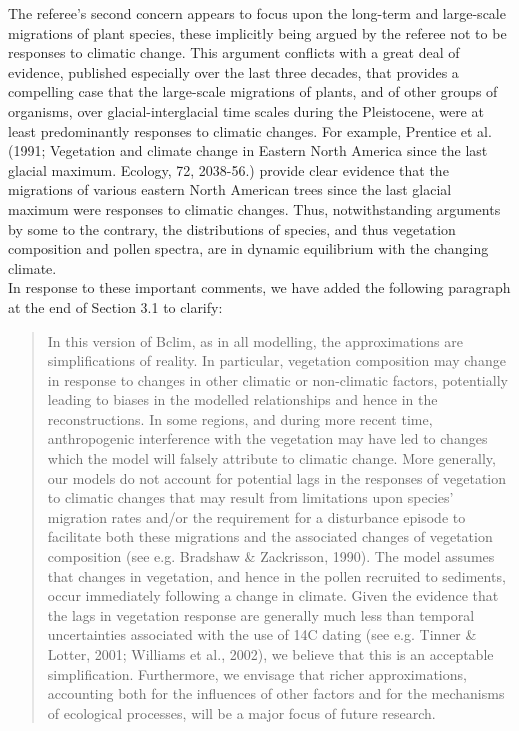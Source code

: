 \documentclass[a4paper,11pt]{article}
\begin{document}
The referee's second concern appears to focus upon the long-term and large-scale migrations of plant species, these implicitly being argued by the referee not to be responses to climatic change. This argument conflicts with a great deal of evidence, published especially over the last three decades, that provides a compelling case that the large-scale migrations of plants, and of other groups of organisms, over glacial-interglacial time scales during the Pleistocene, were at least predominantly responses to climatic changes. For example, Prentice et al. (1991; Vegetation and climate change in Eastern North America since the last glacial maximum. Ecology, 72, 2038-56.) provide clear evidence that the migrations of various eastern North American trees since the last glacial maximum were responses to climatic changes. Thus, notwithstanding arguments by some to the contrary, the distributions of species, and thus vegetation composition and pollen spectra, are in dynamic equilibrium with the changing climate.\\

In response to these important comments, we have added the following paragraph at the end of Section 3.1 to clarify:
\begin{quote}
In this version of Bclim, as in all modelling, the approximations are simplifications of reality. In particular, vegetation composition may change in response to changes in other climatic or non-climatic factors, potentially leading to biases in the modelled relationships and hence in the reconstructions. In some regions, and during more recent time, anthropogenic interference with the vegetation may have led to changes which the model will falsely attribute to climatic change. More generally, our models do not account for potential lags in the responses of vegetation to climatic changes that may result from limitations upon species' migration rates and/or the requirement for a disturbance episode to facilitate both these migrations and the associated changes of vegetation composition (see e.g. Bradshaw \& Zackrisson, 1990). The model assumes that changes in vegetation, and hence in the pollen recruited to sediments, occur immediately following a change in climate. Given the evidence that the lags in vegetation response are generally much less than temporal uncertainties associated with the use of 14C dating (see e.g. Tinner \& Lotter, 2001; Williams et al., 2002), we believe that this is an acceptable simplification. Furthermore, we envisage that richer approximations, accounting both for the influences of other factors and for the mechanisms of ecological processes, will be a major focus of future research.
\end{quote}
\end{document}
